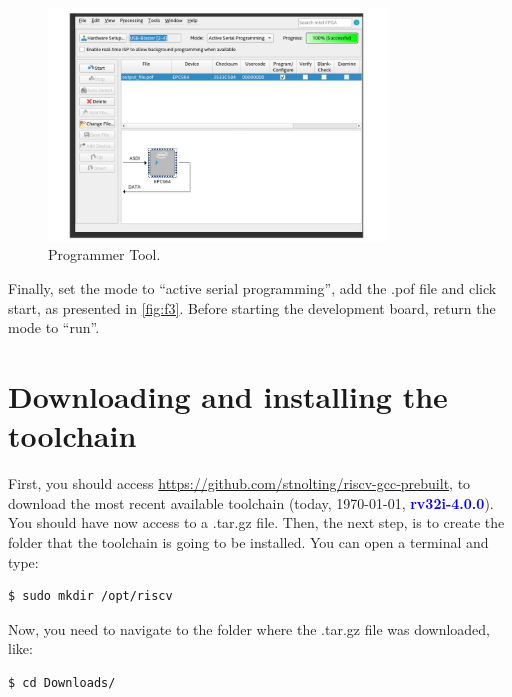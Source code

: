             \begin{figure}[!ht]
                \begin{center}
                    \includegraphics[width= 0.8\textwidth]{figures/chap2/fpga3.jpg}
                    \caption{\label{fig:f3} Programmer Tool.}
                \end{center}
            \end{figure}
        
        Finally, set the mode to ``active serial programming'', add the .pof file and click start, as presented in \autoref{fig:f3}. Before starting the development board, return the mode to ``run''.

        \section{Downloading and installing the toolchain} \label{sec:section_rec.2}
    
            First, you should access \url{https://github.com/stnolting/riscv-gcc-prebuilt}, to download the most recent available toolchain (today, \today, \textcolor{blue}{\textbf{rv32i-4.0.0}}). You should have now access to a .tar.gz file. Then, the next step, is to create the folder that the toolchain is going to be installed. You can open a terminal and type:
            
                \begin{lstlisting}[style=mystyle_bash, language=bash]
                    $ sudo mkdir /opt/riscv
                \end{lstlisting}
            
            Now, you need to navigate to the folder where the .tar.gz file was downloaded, like:
            
                \begin{lstlisting}[style=mystyle_bash, language=bash]
                    $ cd Downloads/
                \end{lstlisting}
                
